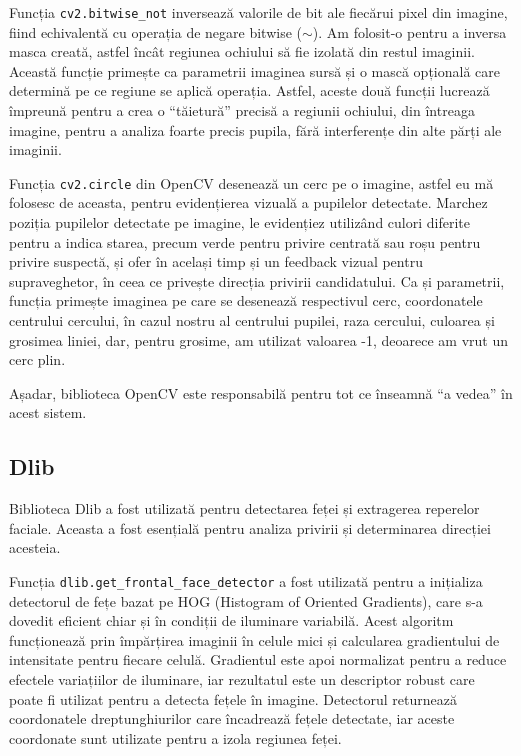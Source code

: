 \documentclass[12pt,a4paper]{article}
\begin{document}
Funcția \texttt{cv2.bitwise\_not} inversează valorile de bit ale fiecărui pixel
din imagine, fiind echivalentă cu operația de negare bitwise ($\sim$). Am
folosit-o pentru a inversa masca creată, astfel încât regiunea ochiului
să fie izolată din restul imaginii. Această funcție primește ca
parametrii imaginea sursă și o mască opțională care determină pe ce
regiune se aplică operația. Astfel, aceste două funcții lucrează
împreună pentru a crea o ``tăietură'' precisă a regiunii ochiului, din
întreaga imagine, pentru a analiza foarte precis pupila, fără
interferențe din alte părți ale imaginii.

Funcția \texttt{cv2.circle} din OpenCV desenează un cerc pe o imagine, astfel eu
mă folosesc de aceasta, pentru evidențierea vizuală a pupilelor
detectate. Marchez poziția pupilelor detectate pe imagine, le evidențiez
utilizând culori diferite pentru a indica starea, precum verde pentru
privire centrată sau roșu pentru privire suspectă, și ofer în același
timp și un feedback vizual pentru supraveghetor, în ceea ce privește
direcția privirii candidatului. Ca și parametrii, funcția primește
imaginea pe care se desenează respectivul cerc, coordonatele centrului
cercului, în cazul nostru al centrului pupilei, raza cercului, culoarea
și grosimea liniei, dar, pentru grosime, am utilizat valoarea -1,
deoarece am vrut un cerc plin.

Așadar, biblioteca OpenCV este responsabilă pentru tot ce înseamnă ``a
vedea'' în acest sistem.

\subsection{Dlib}
Biblioteca Dlib a fost utilizată pentru detectarea feței și extragerea reperelor faciale\cite{el2023drowsiness}. Aceasta a fost esențială pentru analiza privirii și determinarea direcției acesteia. 

Funcția \texttt{dlib.get\_frontal\_face\_detector} a fost utilizată pentru a inițializa detectorul de fețe bazat pe HOG (Histogram of Oriented Gradients), care s-a dovedit eficient chiar și în condiții de iluminare variabilă. Acest algoritm funcționează prin împărțirea imaginii în celule mici și calcularea gradientului de intensitate pentru fiecare celulă. Gradientul este apoi normalizat pentru a reduce efectele variațiilor de iluminare, iar rezultatul este un descriptor robust care poate fi utilizat pentru a detecta fețele în imagine. Detectorul returnează coordonatele dreptunghiurilor care încadrează fețele detectate, iar aceste coordonate sunt utilizate pentru a izola regiunea feței.
\end{document}
